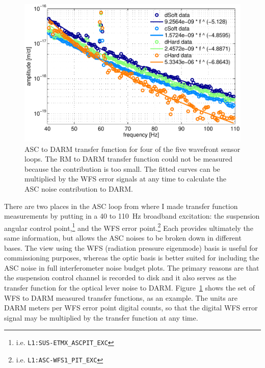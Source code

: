 \begin{figure}
\begin{centering}
\includegraphics[width=1.0\columnwidth]{figures/ASC2DARM_TFs.pdf}
\caption[WFS to DARM transfer functions]{ASC to DARM transfer
  function for four of the five wavefront sensor loops. The RM to DARM
  transfer function could not be measured because the contribution is
  too small. The fitted curves can be multiplied by the WFS error
  signals at any time to calculate the ASC noise contribution to
  DARM.}
\label{fig:asc2darmTF}
\end{centering}
\end{figure}

There are two places in the ASC loop from where I made transfer
function measurements by putting in a 40 to 110~Hz broadband
excitation: the suspension angular control
point,\footnote{i.e. \texttt{L1:SUS-ETMX\_ASCPIT\_EXC}} and the WFS
error point.\footnote{i.e. \texttt{L1:ASC-WFS1\_PIT\_EXC}} Each
provides ultimately the same information, but allows the ASC noises to
be broken down in different bases. The view using the WFS (radiation
pressure eigenmode) basis is useful for commissioning purposes,
whereas the optic basis is better suited for including the ASC noise
in full interferometer noise budget plots. The primary reasons are
that the suspension control channel is recorded to disk and it also
serves as the transfer function for the optical lever noise to DARM.
Figure~\ref{fig:asc2darmTF} shows the set of WFS to DARM measured
transfer functions, as an example. The units are DARM meters per WFS
error point digital counts, so that the digital WFS error signal may
be multiplied by the transfer function at any time.


